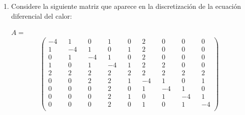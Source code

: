 \documentclass{udpreport}
\begin{document}
\begin{enumerate}
 	\item  Considere la siguiente matriz que aparece en la discretización de la ecuación diferencial del calor:

    $A = $
    \[
 	\left(
 	\begin{array}{ccccccccc}
 	
 	  -4 && 1  && 0   && 1   && 0   && 2 && 0   && 0   && 0 \\
 	   1 && -4 && 1   && 0   && 1   && 2 && 0   && 0   && 0 \\ 	   
 	   0 && 1  && -4  && 1   && 0   && 2 && 0   && 0   && 0 \\ 	   
 	   1 && 0  && 1   && -4  && 1   && 2 && 2 && 0   && 0 \\ 	   
 	   2 && 2 &&2  && 2 && 2 && 2 && 2 && 2 && 2 \\ 	   
 	   0 && 0  && 2 && 2 && 1   && -4  && 1   && 0   && 1 \\ 	   
 	   0 && 0  && 0   && 2 && 0   && 1   && -4  && 1   && 0 \\ 	   
 	   0 && 0  && 0   && 2 && 1   && 0   && 1   && -4  && 1 \\ 	   
 	   0 && 0  && 0   && 2 && 0   && 1   && 0   && 1   && -4 \\
 	   
 	\end{array}
 	\right) 
 	\]


\end{enumerate}
\end{document}
